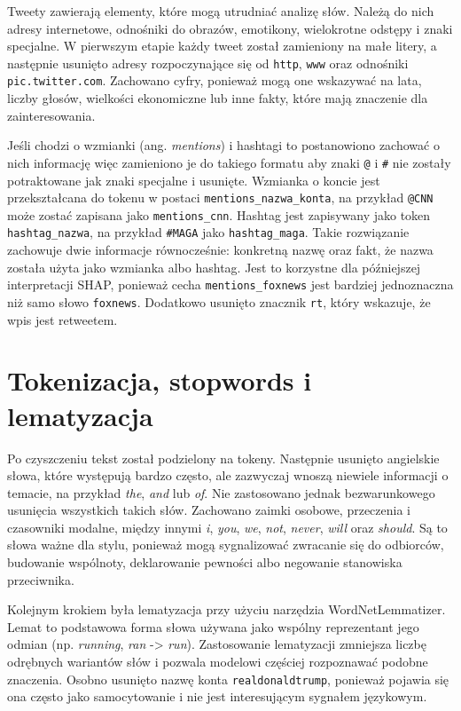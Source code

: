 \documentclass[12pt, a4paper, oneside]{scrreprt}
\begin{document}
Tweety zawierają elementy, które mogą utrudniać analizę słów.
Należą do nich adresy internetowe, odnośniki do obrazów, emotikony, wielokrotne odstępy
i znaki specjalne. W pierwszym etapie każdy tweet został zamieniony na małe litery,
a następnie usunięto adresy rozpoczynające się od \texttt{http},
\texttt{www} oraz odnośniki \texttt{pic.twitter.com}. Zachowano cyfry,
ponieważ mogą one wskazywać na lata, liczby głosów, wielkości ekonomiczne
lub inne fakty, które mają znaczenie dla zainteresowania.

Jeśli chodzi o wzmianki (ang. \textit{mentions}) i hashtagi to postanowiono zachować o nich informację
więc zamieniono je do takiego formatu aby znaki \texttt{@} i \texttt{\#} nie zostały potraktowane jak znaki specjalne i usunięte.
Wzmianka o koncie jest przekształcana do tokenu w postaci
\texttt{mentions\_nazwa\_konta}, na przykład \texttt{@CNN} może zostać
zapisana jako \texttt{mentions\_cnn}. Hashtag jest zapisywany jako
token \texttt{hashtag\_nazwa}, na przykład \texttt{\#MAGA} jako
\texttt{hashtag\_maga}. Takie rozwiązanie zachowuje dwie
informacje równocześnie: konkretną nazwę oraz fakt, że nazwa
została użyta jako wzmianka albo hashtag. Jest to korzystne dla
późniejszej interpretacji SHAP, ponieważ cecha \texttt{mentions\_foxnews}
jest bardziej jednoznaczna niż samo słowo \texttt{foxnews}. Dodatkowo
usunięto znacznik \texttt{rt}, który wskazuje, że wpis jest retweetem.

\section{Tokenizacja, stopwords i lematyzacja}

Po czyszczeniu tekst został podzielony na tokeny. Następnie
usunięto angielskie słowa, które występują bardzo często, ale zazwyczaj
wnoszą niewiele informacji o temacie, na przykład \emph{the},
\emph{and} lub \emph{of}. Nie zastosowano jednak bezwarunkowego
usunięcia wszystkich takich słów. Zachowano zaimki osobowe, przeczenia i
czasowniki modalne, między innymi \emph{i}, \emph{you}, \emph{we}, \emph{not},
\emph{never}, \emph{will} oraz \emph{should}. Są to słowa ważne dla stylu,
ponieważ mogą sygnalizować zwracanie się do odbiorców,
budowanie wspólnoty, deklarowanie pewności albo negowanie stanowiska przeciwnika.

Kolejnym krokiem była lematyzacja przy użyciu narzędzia WordNetLemmatizer.
Lemat to podstawowa forma słowa używana jako wspólny reprezentant jego
odmian (np. \emph{running}, \emph{ran} -> \emph{run}).
Zastosowanie lematyzacji zmniejsza liczbę odrębnych wariantów słów i
pozwala modelowi częściej rozpoznawać podobne znaczenia. Osobno usunięto
nazwę konta \texttt{realdonaldtrump}, ponieważ pojawia się ona często
jako samocytowanie i nie jest interesującym sygnałem językowym.
\end{document}
